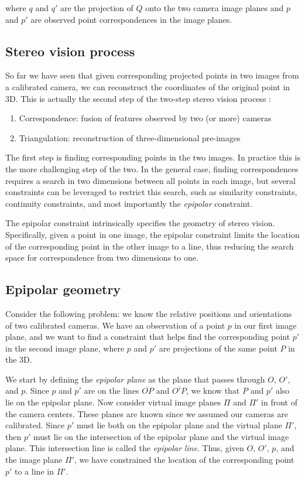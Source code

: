 \documentclass[twoside]{article}
\begin{document}
where $q$ and $q'$ are the projection of $Q$ onto the two camera image planes and $p$ and $p'$ are observed point correspondences in the image planes.

\subsection{Stereo vision process}

So far we have seen that given corresponding projected points in two images from a calibrated camera, we can reconstruct the coordinates of the original point in 3D. This is actually the second step of the two-step stereo vision process :

\begin{enumerate}
  \item Correspondence: fusion of features observed by two (or more) cameras
  \item Triangulation: reconstruction of three-dimensional pre-images
\end{enumerate}

The first step is finding corresponding points in the two images. In practice this is the more challenging step of the two. In the general case, finding correspondences requires a search in two dimensions between all points in each image, but several constraints can be leveraged to restrict this search, such as similarity constraints, continuity constraints, and most importantly the \emph{epipolar} constraint.

The epipolar constraint intrinsically specifies the geometry of stereo vision. Specifically, given a point in one image, the epipolar constraint limits the location of the corresponding point in the other image to a line, thus reducing the search space for correspondence from two dimensions to one.

\subsection{Epipolar geometry}

Consider the following problem: we know the relative positions and orientations of two calibrated cameras. We have an observation of a point $p$ in our first image plane, and we want to find a constraint that helps find the corresponding point $p'$ in the second image plane, where $p$ and $p'$ are projections of the same point $P$ in the 3D.

We start by defining the \emph{epipolar plane} as the plane that passes through $O$, $O'$, and $p$. Since $p$ and $p'$ are on the lines $\overline{OP}$ and $\overline{O'P}$, we know that $P$ and $p'$ also lie on the epipolar plane. Now consider virtual image planes $\Pi$ and $\Pi'$ in front of the camera centers. These planes are known since we assumed our cameras are calibrated. Since $p'$ must lie both on the epipolar plane and the virtual plane $\Pi'$, then $p'$ must lie on the intersection of the epipolar plane and the virtual image plane. This intersection line is called the \emph{epipolar line}. Thus, given $O$, $O'$, $p$, and the image plane $\Pi'$, we have constrained the location of the corresponding point $p'$ to a line in $\Pi'$.
\end{document}
